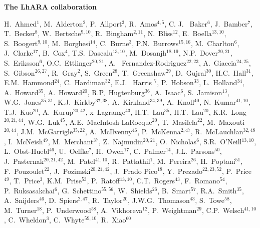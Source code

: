\vspace{0.75cm}
\begin{center}
  {\bf \color{BlueViolet} The LhARA collaboration} \\
\end{center}
\vspace{0.50cm}
\begin{center}
  H.~Ahmed$^{1}$,
  M.~Alderton$^{2}$,
  P.~Allport$^{3}$,
  R.~Amos$^{4,5}$,
  C. J. ~Baker$^{6}$,
  J.~Bamber$^{7}$,
  T.~Becker$^{8}$,
  W.~Bertsche$^{9,10}$,
  R.~Bingham$^{2,11}$,
  N.~Bliss$^{12}$,
  E.~Boella$^{13,10}$,
  S.~Boogert$^{9,10}$,
  M.~Borghesi$^{14}$,
  C.~Burne$^{3}$,
  P.N.~Burrows$^{15,16}$,
  M.~Charlton$^{6}$,
  J.~Clarke$^{17}$,
  B.~Cox$^{4}$,
  T.S.~Dascalu$^{13,10}$,
  M.~Dosanjh$^{18,19}$,
  N.P.~Dover$^{20,21}$,
  S.~Eriksson$^{6}$,
  O.C.~Ettlinger$^{20,21}$,
  A. ~Fernandez-Rodriguez$^{22,23}$,
  A.~Giaccia$^{24,25}$,
  S.~Gibson$^{26,27}$,
  R.~Gray$^{2}$,
  S.~Green$^{28}$,
  T.~Greenshaw$^{29}$,
  D.~Gujral$^{30}$,
  H.C.~Hall$^{31}$,
  E.M.~Hammond$^{24}$,
  C.~Hardiman$^{32}$,
  E.J. ~Harris $^{7}$,
  P.~Hobson$^{33}$,
  L.~Holland$^{34}$,
  A.~Howard$^{35}$,
  A.~Howard$^{20}$,
  R.P,~Hugtenburg$^{36}$,
  A.~Isaac$^{6}$,
  S.~Jamison$^{13}$,
  W.G.~Jones$^{35,31}$,
  K.J.~Kirkby$^{37,38}$,
  A.~Kirkland$^{34,39}$,
  A.~Knoll$^{40}$,
  N.~Kumar$^{41,10}$,
  T.J.~Kuo$^{20}$,
  A.~Kurup$^{20,42}$,
  x~Lagrange$^{43}$,
  H.T.~Lau$^{35}$,
  H.T.~Lau$^{20}$,
  K.R.~Long$^{20,21,44}$,
  W.G.~Luk$^{45}$,
  A.E.~MacIntosh-LaRocque$^{20}$,
  T.~Masilela$^{22}$,
  M.~Maxouti$^{20,44}$,
  J.M.~McGarrigle$^{35,22}$,
  A.~McIlvenny$^{46}$,
  P.~McKenna$^{2,47}$,
  R.~McLauchlan$^{32,48}$,
  I.~McNeish$^{49}$,
  M.~Merchant$^{37}$,
  Z.~Najmudin$^{20,21}$,
  O.~Nicholas$^{6}$,
  S.R.~O'Neill$^{13,10}$,
  L.~Obst-Huebl$^{46}$,
  U.~Oelfke$^{7}$,
  H.~Owen$^{17}$,
  C.~Palmer$^{14}$,
  J.L.~Parsons$^{50}$,
  J.~Pasternak$^{20,21,42}$,
  M.~Patel$^{41,10}$,
  R.~Pattathil$^{1}$,
  M.~Pereira$^{26}$,
  H.~Poptani$^{51}$,
  F.~Pouzoulet$^{22}$,
  J.~Pozimski$^{20,21,42}$,
  J.~Prado Pico$^{18}$,
  Y.~Prezado$^{22,23,52}$,
  P.~Price$^{49}$,
  T.~Price$^{3}$,
  K.M.~Prise$^{53}$,
  P.~Ratoff$^{13,10}$,
  C.T.~Rogers$^{43}$,
  F.~Romano$^{54}$,
  P.~Ruksasakchai$^{6}$,
  G.~Schettino$^{55,56}$,
  W.~Shields$^{26}$,
  B.~Smart$^{57}$,
  R.A.~Smith$^{35}$,
  A.~Snijders$^{46}$,
  D.~Spiers$^{2,47}$,
  R.~Taylor$^{20}$,
  J.W.G.~Thomason$^{43}$,
  S.~Towe$^{58}$,
  M.~Turner$^{18}$,
  P.~Underwood$^{58}$,
  A.~Vikhoreva$^{12}$,
  P.~Weightman$^{29}$,
  C.P.~Welsch$^{41,10}$,
  C.~Wheldon$^{3}$,
  C.~Whyte$^{59,10}$,
  R.~Xiao$^{60}$
\end{center}
